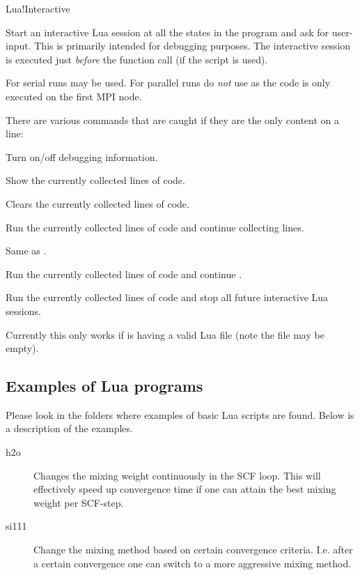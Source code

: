 \begin{fdflogicalF}{Lua!Interactive}

  Start an interactive Lua session at all the states in the program
  and ask for user-input.
  This is primarily intended for debugging purposes. The interactive
  session is executed just \emph{before} the 
  function call (if the script is used).
  
  For serial runs  may be used. For parallel runs do
  \emph{not} use  as the code is only
  executed on the first MPI node.

  There are various commands that are caught if they are the only
  content on a line:
  \begin{fdfoptions}
    \option[/debug]%
    Turn on/off debugging information.

    \option[/show]%
    Show the currently collected lines of code.

    \option[/clear]%
    Clears the currently collected lines of code.

    \option[;]%
    Run the currently collected lines of code and continue collecting
    lines.

    \option[/run]%
    Same as \code{;}.

    \option[/cont]%
    Run the currently collected lines of code and continue \siesta.

    \option[/stop]%
    Run the currently collected lines of code and stop all future
    interactive Lua sessions.

  \end{fdfoptions}

  Currently this only works if  is having a valid Lua
  file (note the file may be empty).
  
\end{fdflogicalF}



\subsection{Examples of Lua programs}

Please look in the  folders where examples of
basic Lua scripts are found. Below is a description of the \program{*}
examples.


\begin{description}
  \item[h2o] Changes the mixing weight continuously in
  the SCF loop. This will effectively speed up convergence time if one
  can attain the best mixing weight per SCF-step.

  \item[si111] Change the mixing method based on certain convergence
  criteria. I.e. after a certain convergence one can switch to a more
  aggressive mixing method.
  
\end{description}

